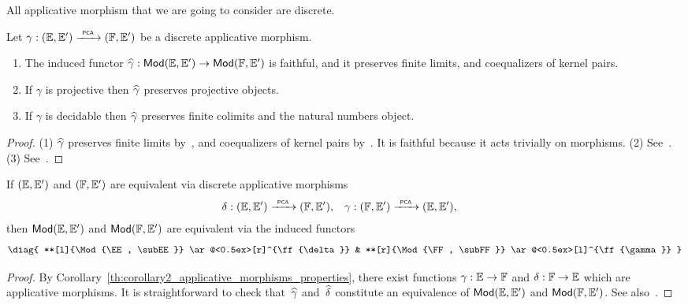 All applicative morphism that we are going to consider are
discrete.

\begin{proposition}
  \label{th:applicative_morphisms_properties}%
  Let $\gamma: ({\mathbb{E}}, {\mathbb{E}'}) \xrightarrow{\scriptscriptstyle\mathsf{\ PCA\ }}{}
  ({\mathbb{F}}, {\mathbb{E}'})$ be a discrete applicative morphism.
  \begin{enumerate}
  \item[(1)] The induced functor $\widehat{\gamma}: \mathsf{Mod}({\mathbb{E}}, {\mathbb{E}'}) \to
    \mathsf{Mod}({\mathbb{F}}, {\mathbb{E}'})$ is faithful, and it preserves finite limits,
    and coequalizers of kernel pairs.
  \item[(2)] If $\gamma$ is projective then $\widehat{\gamma}$ preserves
    projective objects.
  \item[(3)] If $\gamma$ is decidable then $\widehat{\gamma}$ preserves
    finite colimits and the natural numbers object.
  \end{enumerate}
\end{proposition}

\begin{proof}
  (1) $\widehat{\gamma}$ preserves finite limits
  by~\cite[Proposition~2.2.2]{Longley:94}, and coequalizers of kernel
  pairs by~\cite[Proposition~2.2.3]{Longley:94}. It is faithful
  because it acts trivially on morphisms.
  (2) See~\cite[Theorem~2.4.12]{Longley:94}.
  (3) See~\cite[Theorem~2.4.19]{Longley:94}.
\end{proof}


\begin{theorem}
  \label{th:applicative_morphisms_tfae}%
  If $({\mathbb{E}}, {\mathbb{E}'})$ and $({\mathbb{F}}, {\mathbb{E}'})$ are equivalent via discrete
  applicative morphisms
  \begin{align*}
    \delta &: ({\mathbb{E}}, {\mathbb{E}'}) \xrightarrow{\scriptscriptstyle\mathsf{\ PCA\ }}{} ({\mathbb{F}}, {\mathbb{E}'}),
    &
    \gamma &: ({\mathbb{F}}, {\mathbb{E}'}) \xrightarrow{\scriptscriptstyle\mathsf{\ PCA\ }}{} ({\mathbb{E}}, {\mathbb{E}'}),
  \end{align*}
  then $\mathsf{Mod}({\mathbb{E}}, {\mathbb{E}'})$ and $\mathsf{Mod}({\mathbb{F}}, {\mathbb{E}'})$ are equivalent
  via the induced functors
  \begin{equation*}
    \diag{
      **[l]{\Mod{\EE, \subEE}} \ar@<0.5ex>[r]^{\ff{\delta}}
      &
      **[r]{\Mod{\FF, \subFF}} \ar@<0.5ex>[l]^{\ff{\gamma}}
      }
  \end{equation*}
\end{theorem}

\begin{proof}
  By Corollary~\ref{th:corollary2_applicative_morphisms_properties},
  there exist functions $\gamma: {\mathbb{E}} \to {\mathbb{F}}$ and $\delta: {\mathbb{F}} \to
  {\mathbb{E}}$ which are applicative morphisms. It is straightforward to check
  that~$\widehat{\gamma}$ and~$\widehat{\delta}$ constitute an equivalence of
  $\mathsf{Mod}({\mathbb{E}}, {\mathbb{E}'})$ and $\mathsf{Mod}({\mathbb{F}}, {\mathbb{E}'})$. See also~\cite[Theorem
  2.5.6]{Longley:94}.
\end{proof}


